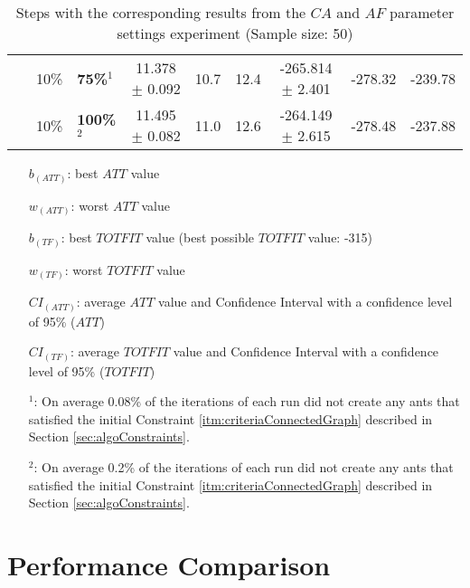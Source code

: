 \begin{sidewaystable}
\begin{tabular}{|l|l|l||c|c|c|c|c|c|}
    ~ & 10\% &\textbf{75\%$^1$} & 11.378 $\pm$ 0.092 & 10.7 & 12.4 & -265.814 $\pm$ 2.401 & -278.32 & -239.78 \\
    ~ & 10\% &\textbf{100\%$^2$} & 11.495 $\pm$ 0.082 & 11.0 & 12.6 & -264.149 $\pm$ 2.615 & -278.48 & -237.88 \\
    \hline
    \end{tabular}
    \caption {Steps with the corresponding results from the $CA$ and $AF$ parameter settings experiment (Sample size: 50)}
    \tiny
    \begin{itemize}[noitemsep]
    \item[$b_{(ATT)}$:] best $ATT$ value
    \item[$w_{(ATT)}$:] worst $ATT$ value
    \item[$b_{(TF)}$:] best $TOTFIT$ value (best possible $TOTFIT$ value: -315)
    \item[$w_{(TF)}$:] worst $TOTFIT$ value
    \item[$CI_{(ATT)}$:] average $ATT$ value and Confidence Interval with a confidence level of 95\% ($ATT$)
    \item[$CI_{(TF)}$:] average $TOTFIT$ value and Confidence Interval with a confidence level of 95\% ($TOTFIT$)
    \item[$^1$:] On average 0.08\% of the iterations of each run did not create any ants that satisfied the initial Constraint \ref{itm:criteriaConnectedGraph} described in Section \vref{sec:algoConstraints}.
    \item[$^2$:] On average 0.2\% of the iterations of each run did not create any ants that satisfied the initial Constraint \ref{itm:criteriaConnectedGraph} described in Section \vref{sec:algoConstraints}.
    \end{itemize}
    \label{table:pm2}
\end{sidewaystable}


\section{Performance Comparison}

